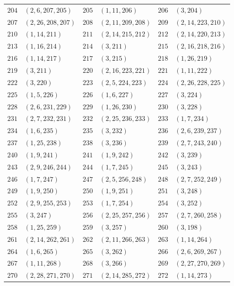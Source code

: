 {\begin{longtable}{@{}rl@{\qquad}rl@{\qquad}rl@{}}
\(204\)&\((2,6,207,205)\) & \(205\)&\((1,11,206)\) & \(206\)&\((3,204)\)\\
\(207\)&\((2,26,208,207)\) & \(208\)&\((2,11,209,208)\) & \(209\)&\((2,14,223,210)\)\\
\(210\)&\((1,14,211)\) & \(211\)&\((2,14,215,212)\) & \(212\)&\((2,14,220,213)\)\\
\(213\)&\((1,16,214)\) & \(214\)&\((3,211)\) & \(215\)&\((2,16,218,216)\)\\
\(216\)&\((1,14,217)\) & \(217\)&\((3,215)\) & \(218\)&\((1,26,219)\)\\
\(219\)&\((3,211)\) & \(220\)&\((2,16,223,221)\) & \(221\)&\((1,11,222)\)\\
\(222\)&\((3,220)\) & \(223\)&\((2,5,224,223)\) & \(224\)&\((2,26,228,225)\)\\
\(225\)&\((1,5,226)\) & \(226\)&\((1,6,227)\) & \(227\)&\((3,224)\)\\
\(228\)&\((2,6,231,229)\) & \(229\)&\((1,26,230)\) & \(230\)&\((3,228)\)\\
\(231\)&\((2,7,232,231)\) & \(232\)&\((2,25,236,233)\) & \(233\)&\((1,7,234)\)\\
\(234\)&\((1,6,235)\) & \(235\)&\((3,232)\) & \(236\)&\((2,6,239,237)\)\\
\(237\)&\((1,25,238)\) & \(238\)&\((3,236)\) & \(239\)&\((2,7,243,240)\)\\
\(240\)&\((1,9,241)\) & \(241\)&\((1,9,242)\) & \(242\)&\((3,239)\)\\
\(243\)&\((2,9,246,244)\) & \(244\)&\((1,7,245)\) & \(245\)&\((3,243)\)\\
\(246\)&\((1,7,247)\) & \(247\)&\((2,5,256,248)\) & \(248\)&\((2,7,252,249)\)\\
\(249\)&\((1,9,250)\) & \(250\)&\((1,9,251)\) & \(251\)&\((3,248)\)\\
\(252\)&\((2,9,255,253)\) & \(253\)&\((1,7,254)\) & \(254\)&\((3,252)\)\\
\(255\)&\((3,247)\) & \(256\)&\((2,25,257,256)\) & \(257\)&\((2,7,260,258)\)\\
\(258\)&\((1,25,259)\) & \(259\)&\((3,257)\) & \(260\)&\((3,198)\)\\
\(261\)&\((2,14,262,261)\) & \(262\)&\((2,11,266,263)\) & \(263\)&\((1,14,264)\)\\
\(264\)&\((1,6,265)\) & \(265\)&\((3,262)\) & \(266\)&\((2,6,269,267)\)\\
\(267\)&\((1,11,268)\) & \(268\)&\((3,266)\) & \(269\)&\((2,27,270,269)\)\\
\(270\)&\((2,28,271,270)\) & \(271\)&\((2,14,285,272)\) & \(272\)&\((1,14,273)\)\\

\end{longtable}}
